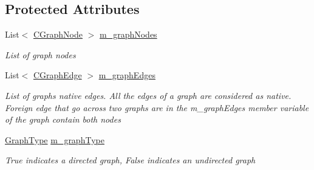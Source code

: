 \subsection*{Protected Attributes}
\begin{DoxyCompactItemize}
\item 
List$<$ \hyperlink{class_graph_library_1_1_c_graph_node}{C\+Graph\+Node} $>$ \hyperlink{class_graph_library_1_1_c_graph_abccc3feed7b02988f555743364ea4ea8}{m\+\_\+graph\+Nodes}
\begin{DoxyCompactList}\small\item\em List of graph nodes \end{DoxyCompactList}\item 
List$<$ \hyperlink{class_graph_library_1_1_c_graph_edge}{C\+Graph\+Edge} $>$ \hyperlink{class_graph_library_1_1_c_graph_af16b65e1c7b51ba0f3be2d5fb4ab67b4}{m\+\_\+graph\+Edges}
\begin{DoxyCompactList}\small\item\em List of graph\textquotesingle{}s native edges. All the edges of a graph are considered as native. Foreign edge that go across two graphs are in the m\+\_\+graph\+Edges member variable of the graph contain both nodes \end{DoxyCompactList}\item 
\hyperlink{namespace_graph_library_1_1_generics_a1bac729ea88e6f3925406df33f15d056}{Graph\+Type} \hyperlink{class_graph_library_1_1_c_graph_a5887f502837519c87dfb654748ee8fc7}{m\+\_\+graph\+Type}
\begin{DoxyCompactList}\small\item\em True indicates a directed graph, False indicates an undirected graph \end{DoxyCompactList}\end{DoxyCompactItemize}
